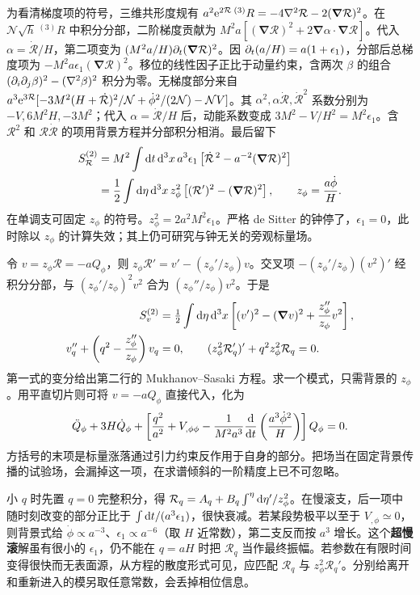 为看清梯度项的符号，三维共形度规有 $a^2\mathrm{e}^{2\mathcal R}\,{}^{(3)}R=-4\nabla^2\mathcal R-2(\bm\nabla\mathcal R)^2$。在 $\mathcal N\sqrt h\,{}^{(3)}R$ 中积分分部，二阶梯度贡献为 $M^2a[(\bm\nabla\mathcal R)^2+2\bm\nabla\alpha\cdot\bm\nabla\mathcal R]$。代入 $\alpha=\dot{\mathcal R}/H$，第二项变为 $(M^2a/H)\partial_t(\bm\nabla\mathcal R)^2$。因 $\partial_t(a/H)=a(1+\epsilon_1)$，分部后总梯度项为 $-M^2a\epsilon_1(\bm\nabla\mathcal R)^2$。移位的线性因子正比于动量约束，含两次 $\beta$ 的组合 $(\partial_i\partial_j\beta)^2-(\nabla^2\beta)^2$ 积分为零。无梯度部分来自 $a^3\mathrm{e}^{3\mathcal R}[-3M^2(H+\dot{\mathcal R})^2/\mathcal N+\dot\phi^2/(2\mathcal N)-\mathcal N V]$。其 $\alpha^2,\alpha\dot{\mathcal R},\dot{\mathcal R}^2$ 系数分别为 $-V,6M^2H,-3M^2$；代入 $\alpha=\dot{\mathcal R}/H$ 后，动能系数变成 $3M^2-V/H^2=M^2\epsilon_1$。含 $\mathcal R^2$ 和 $\mathcal R\dot{\mathcal R}$ 的项用背景方程并分部积分相消。最后留下
\begin{align}
 S^{(2)}_{\mathcal R}&=M^2\int\dd t\,\dd^3x\,a^3\epsilon_1
 \left[\dot{\mathcal R}^{\,2}-a^{-2}(\bm\nabla\mathcal R)^2\right]\nonumber\\
 &=\frac12\int\dd\eta\,\dd^3x\,z_\phi^2
 \left[(\mathcal R')^2-(\bm\nabla\mathcal R)^2\right],
 \qquad z_\phi=\frac{a\dot\phi}{H}.
 \label{eq:cosmo-inf-zaction}
\end{align}
在单调支可固定 $z_\phi$ 的符号。$z_\phi^2=2a^2 M^2\epsilon_1$。严格 de Sitter 的钟停了，$\epsilon_1=0$，此时除以 $z_\phi$ 的计算失效；其上仍可研究与钟无关的旁观标量场。

令 $v=z_\phi\mathcal R=-aQ_\phi$，则 $z_\phi\mathcal R'=v'-(z_\phi'/z_\phi)v$。交叉项 $-(z_\phi'/z_\phi)(v^2)'$ 经积分分部，与 $(z_\phi'/z_\phi)^2v^2$ 合为 $(z_\phi''/z_\phi)v^2$。于是
\begin{align}
 S^{(2)}_v&=\tfrac12\int\dd\eta\,\dd^3x
 \left[(v')^2-(\bm\nabla v)^2+\frac{z_\phi''}{z_\phi}v^2\right],\nonumber\\
 v_q''+\left(q^2-\frac{z_\phi''}{z_\phi}\right)v_q&=0,\qquad
 (z_\phi^2\mathcal R_q')'+q^2 z_\phi^2\mathcal R_q=0 .
 \label{eq:cosmo-inf-MS}
\end{align}
第一式的变分给出第二行的 Mukhanov--Sasaki 方程。求一个模式，只需背景的 $z_\phi$。用平直切片则可将 $v=-aQ_\phi$ 直接代入，化为
\[
 \ddot Q_\phi+3H\dot Q_\phi+
 \left[\frac{q^2}{a^2}+V_{,\phi\phi}
 -\frac{1}{M^2a^3}\frac{\dd}{\dd t}
     \left(\frac{a^3\dot\phi^2}{H}\right)\right]Q_\phi=0 .
\]
方括号的末项是标量涨落通过引力约束反作用于自身的部分。把场当在固定背景传播的试验场，会漏掉这一项，在求谱倾斜的一阶精度上已不可忽略。

小 $q$ 时先置 $q=0$ 完整积分，得 $\mathcal R_q=A_q+B_q\int^\eta\dd\eta'/z_\phi^2$。在慢滚支，后一项中随时刻改变的部分正比于 $\int\dd t/(a^3\epsilon_1)$，很快衰减。若某段势极平以至于 $V_{,\phi}\simeq0$，则背景式给 $\dot\phi\propto a^{-3}$、$\epsilon_1\propto a^{-6}$（取 $H$ 近常数），第二支反而按 $a^3$ 增长。这个\textbf{超慢滚}解虽有很小的 $\epsilon_1$，仍不能在 $q=aH$ 时把 $\mathcal R_q$ 当作最终振幅。若参数在有限时间变得很快而无表面源，从方程的散度形式可见，应匹配 $\mathcal R_q$ 与 $z_\phi^2\mathcal R_q'$。分别给离开和重新进入的模另取任意常数，会丢掉相位信息。

